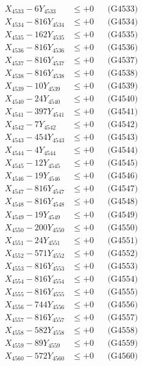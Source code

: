 \documentclass[a4paper,10pt]{article}
\begin{document}
{\begin{align}
X_{4533} - 6Y_{4533} &\leq +0 && \text{(G4533)} \\
X_{4534} - 816Y_{4534} &\leq +0 && \text{(G4534)} \\
X_{4535} - 162Y_{4535} &\leq +0 && \text{(G4535)} \\
X_{4536} - 816Y_{4536} &\leq +0 && \text{(G4536)} \\
X_{4537} - 816Y_{4537} &\leq +0 && \text{(G4537)} \\
X_{4538} - 816Y_{4538} &\leq +0 && \text{(G4538)} \\
X_{4539} - 10Y_{4539} &\leq +0 && \text{(G4539)} \\
X_{4540} - 24Y_{4540} &\leq +0 && \text{(G4540)} \\
\allowbreak
X_{4541} - 397Y_{4541} &\leq +0 && \text{(G4541)} \\
X_{4542} - 7Y_{4542} &\leq +0 && \text{(G4542)} \\
X_{4543} - 454Y_{4543} &\leq +0 && \text{(G4543)} \\
X_{4544} - 4Y_{4544} &\leq +0 && \text{(G4544)} \\
X_{4545} - 12Y_{4545} &\leq +0 && \text{(G4545)} \\
X_{4546} - 19Y_{4546} &\leq +0 && \text{(G4546)} \\
X_{4547} - 816Y_{4547} &\leq +0 && \text{(G4547)} \\
X_{4548} - 816Y_{4548} &\leq +0 && \text{(G4548)} \\
X_{4549} - 19Y_{4549} &\leq +0 && \text{(G4549)} \\
X_{4550} - 200Y_{4550} &\leq +0 && \text{(G4550)} \\
\allowbreak
X_{4551} - 24Y_{4551} &\leq +0 && \text{(G4551)} \\
X_{4552} - 571Y_{4552} &\leq +0 && \text{(G4552)} \\
X_{4553} - 816Y_{4553} &\leq +0 && \text{(G4553)} \\
X_{4554} - 816Y_{4554} &\leq +0 && \text{(G4554)} \\
X_{4555} - 816Y_{4555} &\leq +0 && \text{(G4555)} \\
X_{4556} - 744Y_{4556} &\leq +0 && \text{(G4556)} \\
X_{4557} - 816Y_{4557} &\leq +0 && \text{(G4557)} \\
X_{4558} - 582Y_{4558} &\leq +0 && \text{(G4558)} \\
X_{4559} - 89Y_{4559} &\leq +0 && \text{(G4559)} \\
X_{4560} - 572Y_{4560} &\leq +0 && \text{(G4560)} \\

\end{align}}
\end{document}
